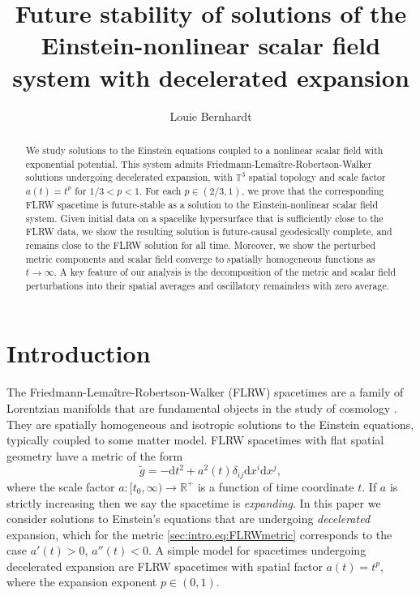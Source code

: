 \documentclass{article}
\title{Future stability of solutions of the Einstein-nonlinear scalar field system with decelerated expansion}
\author{Louie Bernhardt}
\affil{\small University of Melbourne, School of Mathematics and Statistics, Parkville~VIC~3010, Australia}
\date{}
\newcommand{\RR}{\mathbb{R}}
\newcommand{\TT}{\mathbb{T}}
\newcommand{\de}{\mathrm{d}}
\newcommand{\wt}{\widetilde}
\newcommand{\ra}{\rightarrow}
\begin{document}
\newtheorem{theorem}{Theorem}[section]
\newtheorem{proposition}[theorem]{Proposition}
\newtheorem{corollary}[theorem]{Corollary}
\newtheorem{lemma}[theorem]{Lemma}
\theoremstyle{definition}
\newtheorem{definition}[theorem]{Definition}
\theoremstyle{remark}
\newtheorem{remark}[theorem]{Remark}
\maketitle
\begin{abstract}
    We study solutions to the Einstein equations coupled to a nonlinear scalar field with exponential potential. This system admits Friedmann-Lema\^itre-Robertson-Walker solutions undergoing decelerated expansion, with $\TT^3$ spatial topology and scale factor $a(t) = t^p$ for $1/3 < p < 1$. For each $p \in (2/3,1)$, we prove that the corresponding FLRW spacetime is future-stable as a solution to the Einstein-nonlinear scalar field system. Given initial data on a spacelike hypersurface that is sufficiently close to the FLRW data, we show the resulting solution is future-causal geodesically complete, and remains close to the FLRW solution for all time. Moreover, we show the perturbed metric components and scalar field converge to spatially homogeneous functions as $t \ra \infty$. A key feature of our analysis is the decomposition of the metric and scalar field perturbations into their spatial averages and oscillatory remainders with zero average.
\end{abstract}
\small\tableofcontents
\normalsize\section{Introduction}
The Friedmann-Lema\^itre-Robertson-Walker (FLRW) spacetimes are a family of Lorentzian manifolds that are fundamental objects in the study of cosmology \cite{Fri:FLRW:22,Rin:cosmologyreview:25}. They are spatially homogeneous and isotropic solutions to the Einstein equations, typically coupled to some matter model. FLRW spacetimes with flat spatial geometry have a metric of the form
\begin{equation}\label{sec:intro.eq:FLRWmetric}
    \wt{g} = -\de t^2 + a^2(t) \delta_{ij}\de x^i \de x^j,
\end{equation}
where the scale factor $a:[t_0,\infty) \ra \RR^+$ is a function of time coordinate $t$. If $a$ is strictly increasing then we say the spacetime is \emph{expanding}. In this paper we consider solutions to Einstein's equations that are undergoing \emph{decelerated} expansion, which for the metric \eqref{sec:intro.eq:FLRWmetric} corresponds to the case $a'(t) > 0$, $a''(t) < 0$. A simple model for spacetimes undergoing decelerated expansion are FLRW spacetimes with spatial factor $a(t) = t^p$, where the expansion exponent $p \in (0,1)$.
\end{document}
